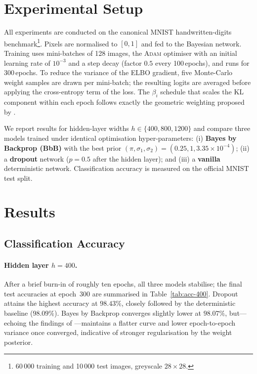 \documentclass{article}
\begin{document}
\section{Experimental Setup}

All experiments are conducted on the canonical \textsc{MNIST} handwritten-digits benchmark\footnote{60\,000 training and 10\,000 test images, greyscale $28\times28$.}.  Pixels are normalised to $[0,1]$ and fed to the Bayesian network.  Training uses mini-batches of 128 images, the \textsc{Adam} optimiser with an initial learning rate of $10^{-3}$ and a step decay (factor $0.5$ every 100\,epochs), and runs for 300\,epochs.  To reduce the variance of the ELBO gradient, five Monte-Carlo weight samples are drawn per mini-batch; the resulting logits are averaged before applying the cross-entropy term of the loss.  The $\beta_i$ schedule that scales the KL component within each epoch follows exactly the geometric weighting proposed by \cite{blundell2015weight}.  

We report results for hidden-layer widths $h\in\{400,800,1200\}$ and compare three models trained under identical optimisation hyper-parameters:  
(i) \textbf{Bayes by Backprop (BbB)} with the best prior $(\pi,\sigma_1,\sigma_2)=(0.25,1,3.35\times10^{-4})$;  
(ii) a \textbf{dropout} network ($p=0.5$ after the hidden layer); and  
(iii) a \textbf{vanilla} deterministic network.  Classification accuracy is measured on the official MNIST test split.

\section{Results}
\label{sec:Results}

\subsection{Classification Accuracy}

\paragraph{Hidden layer $h=400$.}
After a brief burn-in of roughly ten epochs, all three models stabilise; the final test accuracies at epoch~300 are summarised in Table~\ref{tab:acc-400}.
Dropout attains the highest accuracy at $\mathbf{98.43\%}$, closely followed by the deterministic baseline ($98.09\%$).  
Bayes by Backprop converges slightly lower at $\mathbf{98.07\%}$, but—echoing the findings of \cite{blundell2015weight}—maintains a flatter curve and lower epoch-to-epoch variance once converged, indicative of stronger regularisation by the weight posterior.
\end{document}
